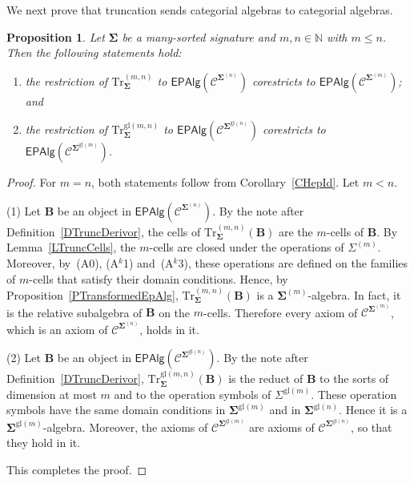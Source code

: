 \documentclass[a4paper, reqno
]{amsart}
\newcommand{\sig}[1]{\mathbf{#1}}             %
\newcommand{\spec}[1]{\boldsymbol{\mathcal{#1}}} %
\newcommand{\gl}{\mathrm{gl}}                %
\newcommand{\Tr}{\mathrm{Tr}}
\theoremstyle{plain}
\newtheorem{proposition}[theorem]{Proposition}
\theoremstyle{definition}
\begin{document}
We next prove that truncation sends categorial algebras to categorial algebras.

\begin{proposition}\label{PTruncDerivor}
Let $\sig{\Sigma}$ be a many-sorted signature and $m,n\in\mathbb{N}$ with $m\leq n$.
Then the following statements hold:
\begin{enumerate}
\item the restriction of $\Tr^{(m,n)}_{\sig{\Sigma}}$ to $\mathsf{EPAlg}(\spec{C}^{\sig{\Sigma}^{(n)}})$ corestricts to $\mathsf{EPAlg}(\spec{C}^{\sig{\Sigma}^{(m)}})$; and
\item the restriction of $\Tr^{\gl(m,n)}_{\sig{\Sigma}}$ to $\mathsf{EPAlg}(\spec{C}^{\sig{\Sigma}^{\gl(n)}})$ corestricts to $\mathsf{EPAlg}(\spec{C}^{\sig{\Sigma}^{\gl(m)}})$.
\end{enumerate}
\end{proposition}
\begin{proof}
For $m=n$, both statements follow from Corollary~\ref{CHepId}.
Let $m<n$.

(1) Let $\mathbf{B}$ be an object in $\mathsf{EPAlg}(\spec{C}^{\sig{\Sigma}^{(n)}})$.
By the note after Definition~\ref{DTruncDerivor}, the cells of $\Tr^{(m,n)}_{\sig{\Sigma}}(\mathbf{B})$ are the $m$-cells of $\mathbf{B}$.
By Lemma~\ref{LTruncCells}, the $m$-cells are closed under the operations of $\Sigma^{(m)}$.
Moreover, by~(A0), (A$^{k}$1) and~(A$^{k}$3), these operations are defined on the families of $m$-cells that satisfy their domain conditions.
Hence, by Proposition~\ref{PTransformedEpAlg}, $\Tr^{(m,n)}_{\sig{\Sigma}}(\mathbf{B})$ is a $\sig{\Sigma}^{(m)}$-algebra.
In fact, it is the relative subalgebra of $\mathbf{B}$ on the $m$-cells.
Therefore every axiom of $\spec{C}^{\sig{\Sigma}^{(m)}}$, which is an axiom of $\spec{C}^{\sig{\Sigma}^{(n)}}$, holds in it.

(2) Let $\mathbf{B}$ be an object in $\mathsf{EPAlg}(\spec{C}^{\sig{\Sigma}^{\gl(n)}})$.
By the note after Definition~\ref{DTruncDerivor}, $\Tr^{\gl(m,n)}_{\sig{\Sigma}}(\mathbf{B})$ is the reduct of $\mathbf{B}$ to the sorts of dimension at most $m$ and to the operation symbols of $\Sigma^{\gl(m)}$.
These operation symbols have the same domain conditions in $\sig{\Sigma}^{\gl(m)}$ and in $\sig{\Sigma}^{\gl(n)}$.
Hence it is a $\sig{\Sigma}^{\gl(m)}$-algebra.
Moreover, the axioms of $\spec{C}^{\sig{\Sigma}^{\gl(m)}}$ are axioms of $\spec{C}^{\sig{\Sigma}^{\gl(n)}}$, so that they hold in it.

This completes the proof.
\end{proof}
\end{document}
